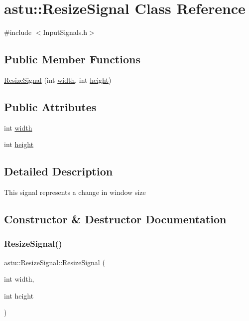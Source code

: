 \hypertarget{classastu_1_1ResizeSignal}{}\section{astu\+:\+:Resize\+Signal Class Reference}
\label{classastu_1_1ResizeSignal}


{\ttfamily \#include $<$Input\+Signals.\+h$>$}

\subsection*{Public Member Functions}
\begin{DoxyCompactItemize}
\item 
\hyperlink{classastu_1_1ResizeSignal_ac0d04af749258bdf425537fb66ccbf15}{Resize\+Signal} (int \hyperlink{classastu_1_1ResizeSignal_a028489521e952316f52b19f0bf4ebf0b}{width}, int \hyperlink{classastu_1_1ResizeSignal_aa61f62da490dd5fb196536dabb70640c}{height})
\end{DoxyCompactItemize}
\subsection*{Public Attributes}
\begin{DoxyCompactItemize}
\item 
int \hyperlink{classastu_1_1ResizeSignal_a028489521e952316f52b19f0bf4ebf0b}{width}
\item 
int \hyperlink{classastu_1_1ResizeSignal_aa61f62da490dd5fb196536dabb70640c}{height}
\end{DoxyCompactItemize}


\subsection{Detailed Description}
This signal represents a change in window size 

\subsection{Constructor \& Destructor Documentation}
\mbox{\label{classastu_1_1ResizeSignal_ac0d04af749258bdf425537fb66ccbf15}} 
\subsubsection{\texorpdfstring{Resize\+Signal()}{ResizeSignal()}}
{\footnotesize\ttfamily astu\+::\+Resize\+Signal\+::\+Resize\+Signal (\begin{DoxyParamCaption}\item[{int}]{width,  }\item[{int}]{height }\end{DoxyParamCaption})\hspace{0.3cm}{\ttfamily [inline]}}

